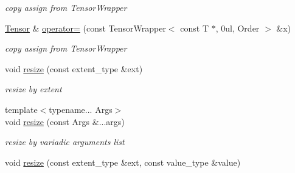\begin{DoxyCompactItemize}
\begin{DoxyCompactList}\small\item\em copy assign from TensorWrapper \item\end{DoxyCompactList}\item 
\hypertarget{classbtas_1_1_tensor_3_01_t_00_010ul_00_01_order_01_4_a2b581ec20c9f515dbb6e3b6a702681f9}{
\hyperlink{classbtas_1_1_tensor}{Tensor} \& \hyperlink{classbtas_1_1_tensor_3_01_t_00_010ul_00_01_order_01_4_a2b581ec20c9f515dbb6e3b6a702681f9}{operator=} (const TensorWrapper$<$ const T $\ast$, 0ul, Order $>$ \&x)}
\label{classbtas_1_1_tensor_3_01_t_00_010ul_00_01_order_01_4_a2b581ec20c9f515dbb6e3b6a702681f9}

\begin{DoxyCompactList}\small\item\em copy assign from TensorWrapper \item\end{DoxyCompactList}\item 
\hypertarget{classbtas_1_1_tensor_3_01_t_00_010ul_00_01_order_01_4_a91df5459cf6af1e7e95de020466b7a4c}{
void \hyperlink{classbtas_1_1_tensor_3_01_t_00_010ul_00_01_order_01_4_a91df5459cf6af1e7e95de020466b7a4c}{resize} (const extent\_\-type \&ext)}
\label{classbtas_1_1_tensor_3_01_t_00_010ul_00_01_order_01_4_a91df5459cf6af1e7e95de020466b7a4c}

\begin{DoxyCompactList}\small\item\em resize by extent \item\end{DoxyCompactList}\item 
\hypertarget{classbtas_1_1_tensor_3_01_t_00_010ul_00_01_order_01_4_a5c72cbff3b93202a589a649536b2fae0}{
{\footnotesize template$<$typename... Args$>$ }\\void \hyperlink{classbtas_1_1_tensor_3_01_t_00_010ul_00_01_order_01_4_a5c72cbff3b93202a589a649536b2fae0}{resize} (const Args \&...args)}
\label{classbtas_1_1_tensor_3_01_t_00_010ul_00_01_order_01_4_a5c72cbff3b93202a589a649536b2fae0}

\begin{DoxyCompactList}\small\item\em resize by variadic arguments list \item\end{DoxyCompactList}\item 
\hypertarget{classbtas_1_1_tensor_3_01_t_00_010ul_00_01_order_01_4_a058201c9fa1593cf60e44f126eaf6943}{
void \hyperlink{classbtas_1_1_tensor_3_01_t_00_010ul_00_01_order_01_4_a058201c9fa1593cf60e44f126eaf6943}{resize} (const extent\_\-type \&ext, const value\_\-type \&value)}
\label{classbtas_1_1_tensor_3_01_t_00_010ul_00_01_order_01_4_a058201c9fa1593cf60e44f126eaf6943}


\end{DoxyCompactItemize}
